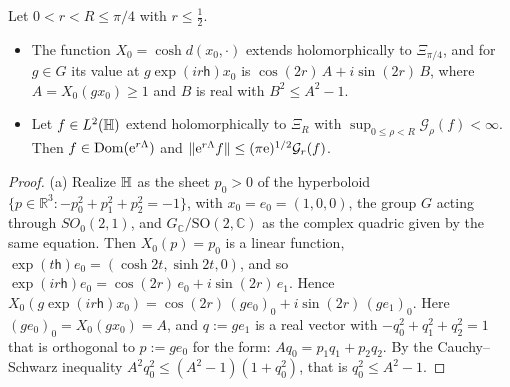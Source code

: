 \begin{lemma}\label{lem:gutzmer}
Let $0<r<R\le\pi/4$ with $r\le\tfrac12$.
\begin{itemize}
\item[(a)] The function $X_0=\cosh d(x_0,\cdot)$ extends holomorphically to $\Xi_{\pi/4}$, and for $g\in G$ its value at
$g\exp(ir\mathsf h)x_0$ is $\cos(2r)\,A+i\sin(2r)\,B$, where $A=X_0(gx_0)\ge1$ and $B$ is real with $B^2\le A^2-1$.
\item[(b)] Let $f\in L^2(\mathbb{H})$ extend holomorphically to $\Xi_R$ with $\sup_{0\le\rho<R}\mathcal G_\rho(f)<\infty$. Then
$f\in\operatorname{Dom}(\mathrm{e}^{r\Lambda})$ and $\lVert \mathrm{e}^{r\Lambda}f\rVert\le(\pi\mathrm{e})^{1/2}\mathcal G_r(f)$.
\end{itemize}
\end{lemma}
\begin{proof}
(a) Realize $\mathbb{H}$ as the sheet $p_0>0$ of the hyperboloid $\{p\in\mathbb R^3:-p_0^2+p_1^2+p_2^2=-1\}$, with $x_0=e_0=(1,0,0)$, the group $G$
acting through $SO_0(2,1)$, and $G_{\mathbb C}/\mathrm{SO}(2,\mathbb C)$ as the complex quadric given by the same equation. Then $X_0(p)=p_0$ is a linear function,
$\exp(t\mathsf h)e_0=(\cosh2t,\sinh2t,0)$, and so $\exp(ir\mathsf h)e_0=\cos(2r)\,e_0+i\sin(2r)\,e_1$. Hence
$X_0(g\exp(ir\mathsf h)x_0)=\cos(2r)\,(ge_0)_0+i\sin(2r)\,(ge_1)_0$. Here $(ge_0)_0=X_0(gx_0)=A$, and $q:=ge_1$ is a real vector with
$-q_0^2+q_1^2+q_2^2=1$ that is orthogonal to $p:=ge_0$ for the form: $Aq_0=p_1q_1+p_2q_2$. By the Cauchy--Schwarz inequality
$A^2q_0^2\le(A^2-1)(1+q_0^2)$, that is $q_0^2\le A^2-1$.


\end{proof}
